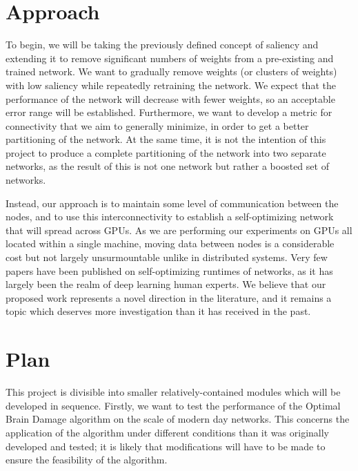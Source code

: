 \documentclass[11pt]{article}
\begin{document}
\section{Approach}
To begin, we will be taking the previously defined concept of saliency and extending it to remove significant numbers of weights from a pre-existing and trained network.
We want to gradually remove weights (or clusters of weights) with low saliency while repeatedly retraining the network.
We expect that the performance of the network will decrease with fewer weights, so an acceptable error range will be established.
Furthermore, we want to develop a metric for connectivity that we aim to generally minimize, in order to get a better partitioning of the network.
At the same time, it is not the intention of this project to produce a complete partitioning of the network into two separate networks, as the result of this is not one network but rather a boosted set of networks.

Instead, our approach is to maintain some level of communication between the nodes, and to use this interconnectivity to establish a self-optimizing network that will spread across GPUs.
As we are performing our experiments on GPUs all located within a single machine, moving data between nodes is a considerable cost but not largely unsurmountable unlike in distributed systems. 
Very few papers have been published on self-optimizing runtimes of networks, as it has largely been the realm of deep learning human experts.
We believe that our proposed work represents a novel direction in the literature, and it remains a topic which deserves more investigation than it has received in the past.

\section{Plan}
This project is divisible into smaller relatively-contained modules which will be developed in sequence.
Firstly, we want to test the performance of the Optimal Brain Damage algorithm on the scale of modern day networks.
This concerns the application of the algorithm under different conditions than it was originally developed and tested; it is likely that modifications will have to be made to ensure the feasibility of the algorithm.
\end{document}
